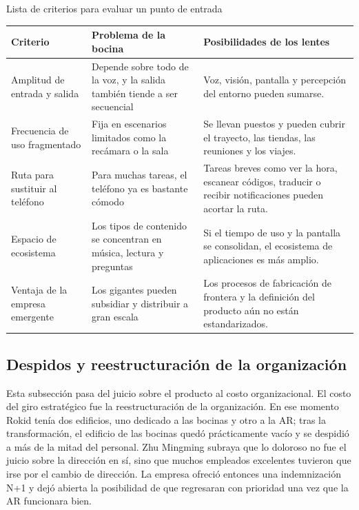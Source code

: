 \begin{knowledgebox}{Lista de criterios para evaluar un punto de entrada}
\noindent\begin{tabularx}{\textwidth}{p{}p{}X}
\toprule
Criterio & Problema de la bocina & Posibilidades de los lentes \\
\midrule
Amplitud de entrada y salida & Depende sobre todo de la voz, y la salida también tiende a ser secuencial & Voz, visión, pantalla y percepción del entorno pueden sumarse. \\
Frecuencia de uso fragmentado & Fija en escenarios limitados como la recámara o la sala & Se llevan puestos y pueden cubrir el trayecto, las tiendas, las reuniones y los viajes. \\
Ruta para sustituir al teléfono & Para muchas tareas, el teléfono ya es bastante cómodo & Tareas breves como ver la hora, escanear códigos, traducir o recibir notificaciones pueden acortar la ruta. \\
Espacio de ecosistema & Los tipos de contenido se concentran en música, lectura y preguntas & Si el tiempo de uso y la pantalla se consolidan, el ecosistema de aplicaciones es más amplio. \\
Ventaja de la empresa emergente & Los gigantes pueden subsidiar y distribuir a gran escala & Los procesos de fabricación de frontera y la definición del producto aún no están estandarizados. \\
\bottomrule
\end{tabularx}
\end{knowledgebox}

\subsection{Despidos y reestructuración de la organización}

Esta subsección pasa del juicio sobre el producto al costo organizacional. El costo del giro estratégico fue la reestructuración de la organización. En ese momento Rokid tenía dos edificios, uno dedicado a las bocinas y otro a la AR; tras la transformación, el edificio de las bocinas quedó prácticamente vacío y se despidió a más de la mitad del personal. Zhu Mingming subraya que lo doloroso no fue el juicio sobre la dirección en sí, sino que muchos empleados excelentes tuvieron que irse por el cambio de dirección. La empresa ofreció entonces una indemnización N+1 y dejó abierta la posibilidad de que regresaran con prioridad una vez que la AR funcionara bien.

